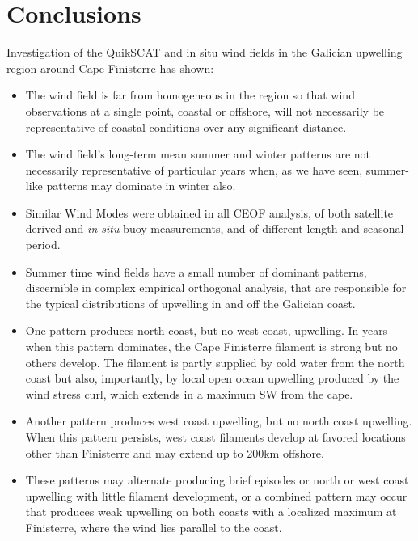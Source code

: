 \section{Conclusions}
Investigation of the QuikSCAT and in situ wind fields in the
Galician upwelling region around Cape Finisterre has shown:
\begin{itemize}
  \item    The wind field is far from homogeneous in the region so that
wind observations at a single point, coastal or offshore, will not
necessarily be representative of coastal conditions over any
significant distance.

  \item   The wind field's long-term mean summer and winter patterns are
not necessarily representative of particular years when, as we
have seen, summer-like patterns may dominate in winter also.

  \item   Similar Wind Modes were obtained in all CEOF analysis, of both
satellite derived and \emph{in situ} buoy measurements, and of
different length and seasonal period.

  \item   Summer time wind fields have a small number of dominant
patterns, discernible in complex empirical orthogonal analysis,
that are responsible for the typical distributions of upwelling in
and off the Galician coast.

  \item   One pattern produces north coast, but no west coast,
upwelling. In years when this pattern dominates, the Cape
Finisterre filament is strong but no others develop. The filament
is partly supplied by cold water from the north coast but also,
importantly, by local open ocean upwelling produced by the wind
stress curl, which extends in a maximum SW from the cape.

  \item   Another pattern produces west coast upwelling, but no
north coast upwelling.  When this pattern persists, west coast
filaments develop at favored locations other than Finisterre and
may extend up to 200km offshore.

  \item   These patterns may alternate producing brief episodes or north
or west coast upwelling with little filament development, or a
combined pattern may occur that produces weak upwelling on both
coasts with a localized maximum at Finisterre, where the wind lies
parallel to the coast.


\end{itemize}
